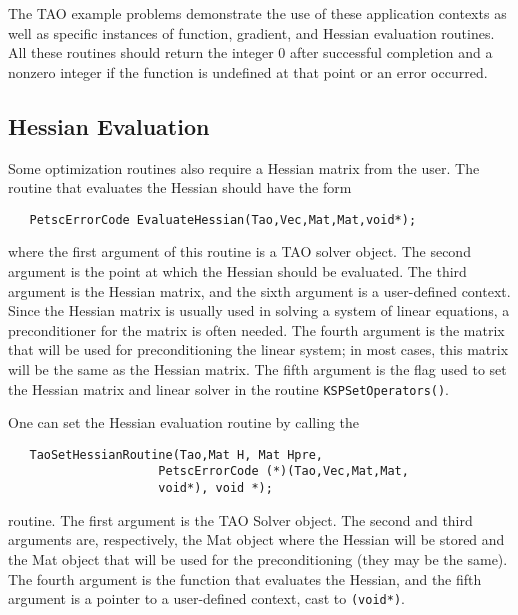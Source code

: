 The TAO example problems demonstrate the use of these application contexts
as well as specific instances of function, gradient, and Hessian 
evaluation routines.
All these routines should return the integer $0$ after 
successful completion and a nonzero integer if the function
is undefined at that point or an error occurred.

\subsection{Hessian Evaluation}
\label{sec:matrixfree}
\label{sec:finitedifference}

Some optimization routines also require a Hessian matrix from the user.
The routine that evaluates the Hessian should have the form 
\begin{verbatim}
   PetscErrorCode EvaluateHessian(Tao,Vec,Mat,Mat,void*);
\end{verbatim}
where the first argument of this routine is a TAO solver object.  The
second
argument is the point at which the Hessian should be evaluated.  The
third argument is the Hessian matrix, and the sixth argument is a
user-defined context.
Since the Hessian matrix is usually used in solving
a system of linear equations, a preconditioner for the matrix is often
needed.  The fourth argument is the matrix that will be used
for preconditioning the linear system; in most cases, this
matrix will be the same as the Hessian matrix.  The fifth
argument is the flag used to set the Hessian matrix and
linear solver in the routine {\tt KSPSetOperators()}.

One can set the Hessian evaluation routine by calling the 
\begin{verbatim}
   TaoSetHessianRoutine(Tao,Mat H, Mat Hpre,
                     PetscErrorCode (*)(Tao,Vec,Mat,Mat,
                     void*), void *);
\end{verbatim}
routine. 
The first argument is the TAO Solver object. The second and third arguments
are, respectively, the Mat object where the Hessian will be stored and 
the Mat object
that will be used for the preconditioning (they may be the same). The fourth 
argument is the function that evaluates the Hessian, 
and the fifth argument is a pointer to a user-defined context,
cast to {\tt (void*)}.

